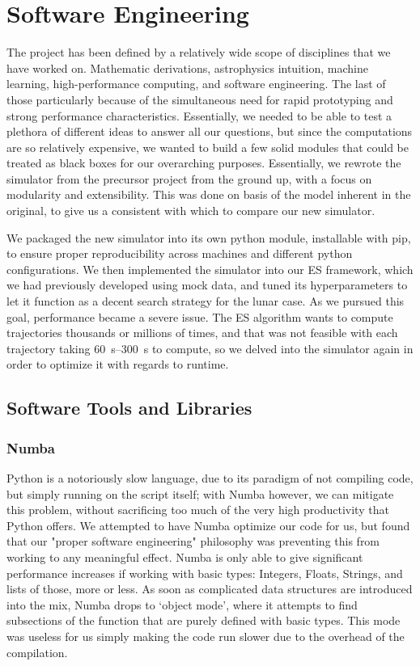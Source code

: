 
\chapter{Software Engineering}

The project has been defined by a relatively wide scope of disciplines that we have worked on. Mathematic derivations, astrophysics intuition, machine learning, high-performance computing, and software engineering. The last of those particularly because of the simultaneous need for rapid prototyping and strong performance characteristics. Essentially, we needed to be able to test a plethora of different ideas to answer all our questions, but since the computations are so relatively expensive, we wanted to build a few solid modules that could be treated as black boxes for our overarching purposes. Essentially, we rewrote the simulator from the precursor project from the ground up, with a focus on modularity and extensibility. This was done on basis of the model inherent in the original, to give us a consistent  with which to compare our new simulator.

We packaged the new simulator into its own python module, installable with pip, to ensure proper reproducibility across machines and different python configurations. We then implemented the simulator into our ES framework, which we had previously developed using mock data, and tuned its hyperparameters to let it function as a decent search strategy for the lunar case. As we pursued this goal, performance became a severe issue. The ES algorithm wants to compute trajectories thousands or millions of times, and that was not feasible with each trajectory taking \SIrange{60}{300}{\second} to compute, so we delved into the simulator again in order to optimize it with regards to runtime.

\section{Software Tools and Libraries}

\subsection{Numba}

Python is a notoriously slow language, due to its paradigm of not compiling code, but simply running on the script itself; with Numba however, we can mitigate this problem, without sacrificing too much of the very high productivity that Python offers. We attempted to have Numba optimize our code for us, but found that our "proper software engineering" philosophy was preventing this from working to any meaningful effect. Numba is only able to give significant performance increases if working with basic types: Integers, Floats, Strings, and lists of those, more or less. As soon as complicated data structures are introduced into the mix, Numba drops to `object mode', where it attempts to find subsections of the function that are purely defined with basic types. This mode was useless for us simply making the code run slower due to the overhead of the compilation.

